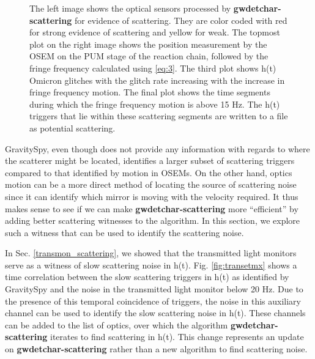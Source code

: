 \documentclass[12pt]{iopart}
\begin{document}
\begin{figure}[h]
\begin{subfigure}[b]{0.5\textwidth}
    
    \end{subfigure}
    \caption{The left image shows the optical sensors processed by \textbf{gwdetchar-scattering} for evidence of scattering. They are color coded with red for strong evidence of scattering and yellow for weak. The topmost plot on the right image shows the position measurement by the OSEM on the PUM stage of the reaction chain, followed by the fringe frequency calculated using \ref{eq:3}. The third plot shows h(t) Omicron glitches with the glitch rate increasing with the increase in fringe frequency motion. The final plot shows the time segments during which the fringe frequency motion is above 15 Hz. The h(t) triggers that lie within these scattering segments are written to a file as potential scattering.}
    \label{fig:summary_optic}
    
\end{figure}

GravitySpy, even though does not provide any information with regards to where the scatterer might be located, identifies a larger subset of scattering triggers compared to that identified by motion in OSEMs. On the other hand, optics motion can be a more direct method of locating the source of scattering noise since it can identify which mirror is moving with the velocity required. It thus makes sense to see if we can make \textbf{gwdetchar-scattering} more ``efficient'' by adding better scattering witnesses to the algorithm. In this section, we explore such a witness that can be used to identify the scattering noise. 

In Sec. \ref{transmon_scattering}, we showed that the transmitted light monitors serve as a witness of slow scattering noise in h(t). Fig. \ref{fig:transetmx} shows a time correlation between the slow scattering triggers in h(t) as identified by GravitySpy and the noise in the transmitted light monitor below 20 Hz. Due to the presence of this temporal coincidence of triggers, the noise in this auxiliary channel can be used to identify the slow scattering noise in h(t). 
These channels can be added to the list of optics, over which the algorithm \textbf{gwdetchar-scattering} iterates to find scattering in h(t). This change represents an update on \textbf{gwdetchar-scattering} rather than a new algorithm to find scattering noise. 
\end{document}
